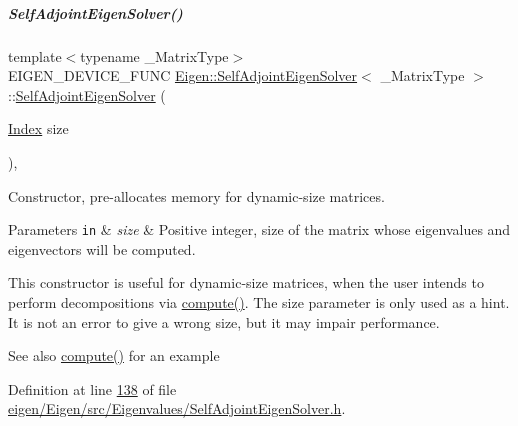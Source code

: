 \mbox{\label{group___eigenvalues___module_af20f466a4c29477271e91841e3382b27}} 
\subparagraph{\texorpdfstring{Self\+Adjoint\+Eigen\+Solver()}{SelfAdjointEigenSolver()}\hspace{0.1cm}{\footnotesize\ttfamily [2/6]}}
{\footnotesize\ttfamily template$<$typename \+\_\+\+Matrix\+Type$>$ \\
E\+I\+G\+E\+N\+\_\+\+D\+E\+V\+I\+C\+E\+\_\+\+F\+U\+NC \hyperlink{group___eigenvalues___module_class_eigen_1_1_self_adjoint_eigen_solver}{Eigen\+::\+Self\+Adjoint\+Eigen\+Solver}$<$ \+\_\+\+Matrix\+Type $>$\+::\hyperlink{group___eigenvalues___module_class_eigen_1_1_self_adjoint_eigen_solver}{Self\+Adjoint\+Eigen\+Solver} (\begin{DoxyParamCaption}\item[{\hyperlink{group___eigenvalues___module_a8a59ab7734b6eae2754fd78bc7c3a360}{Index}}]{size }\end{DoxyParamCaption})\hspace{0.3cm}{\ttfamily [inline]}, {\ttfamily [explicit]}}



Constructor, pre-\/allocates memory for dynamic-\/size matrices. 


\begin{DoxyParams}[1]{Parameters}
\mbox{\tt in}  & {\em size} & Positive integer, size of the matrix whose eigenvalues and eigenvectors will be computed.\\
\hline
\end{DoxyParams}
This constructor is useful for dynamic-\/size matrices, when the user intends to perform decompositions via \hyperlink{group___eigenvalues___module_a88bcdc24112efa7c4d2ebb3476efcbe9}{compute()}. The {\ttfamily size} parameter is only used as a hint. It is not an error to give a wrong {\ttfamily size}, but it may impair performance.

\begin{DoxySeeAlso}{See also}
\hyperlink{group___eigenvalues___module_a88bcdc24112efa7c4d2ebb3476efcbe9}{compute()} for an example 
\end{DoxySeeAlso}


Definition at line \hyperlink{eigen_2_eigen_2src_2_eigenvalues_2_self_adjoint_eigen_solver_8h_source_l00138}{138} of file \hyperlink{eigen_2_eigen_2src_2_eigenvalues_2_self_adjoint_eigen_solver_8h_source}{eigen/\+Eigen/src/\+Eigenvalues/\+Self\+Adjoint\+Eigen\+Solver.\+h}.

